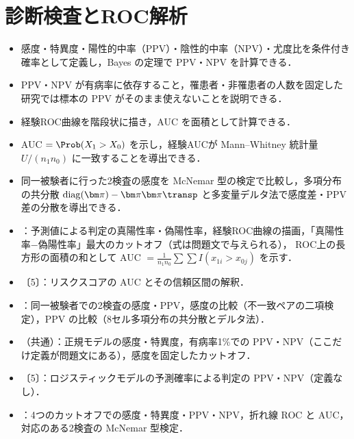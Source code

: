 \chapter{診断検査とROC解析}\label{ch:05}

\begin{goalbox}
\begin{itemize}
\item 感度・特異度・陽性的中率（PPV）・陰性的中率（NPV）・尤度比を条件付き確率として定義し，Bayes の定理で PPV・NPV を計算できる．
\item PPV・NPV が有病率に依存すること，罹患者・非罹患者の人数を固定した研究では標本の PPV がそのまま使えないことを説明できる．
\item 経験ROC曲線を階段状に描き，AUC を面積として計算できる．
\item AUC $=\Prob(X_1>X_0)$ を示し，経験AUCが Mann--Whitney 統計量 $U/(n_1n_0)$ に一致することを導出できる．
\item 同一被験者に行った2検査の感度を McNemar 型の検定で比較し，多項分布の共分散 $\mathrm{diag}(\bm\pi)-\bm\pi\bm\pi\transp$ と多変量デルタ法で感度差・PPV 差の分散を導出できる．
\end{itemize}
\end{goalbox}

\begin{exambox}
\begin{itemize}
\item {}：予測値による判定の真陽性率・偽陽性率，経験ROC曲線の描画，「真陽性率$-$偽陽性率」最大のカットオフ（式は問題文で与えられる），
      ROC上の長方形の面積の和として AUC $=\frac{1}{n_1n_0}\sum\sum I(x_{1i}>x_{0j})$ を示す．
\item {}〔5〕：リスクスコアの AUC とその信頼区間の解釈．
\item {}：同一被験者での2検査の感度・PPV，感度の比較（不一致ペアの二項検定），PPV の比較（8セル多項分布の共分散とデルタ法）．
\item {}（共通）：正規モデルの感度・特異度，有病率1\%での PPV・NPV（ここだけ定義が問題文にある），感度を固定したカットオフ．
\item {}〔5〕：ロジスティックモデルの予測確率による判定の PPV・NPV（定義なし）．
\item {}：4つのカットオフでの感度・特異度・PPV・NPV，折れ線 ROC と AUC，対応のある2検査の McNemar 型検定．
\end{itemize}
\end{exambox}


